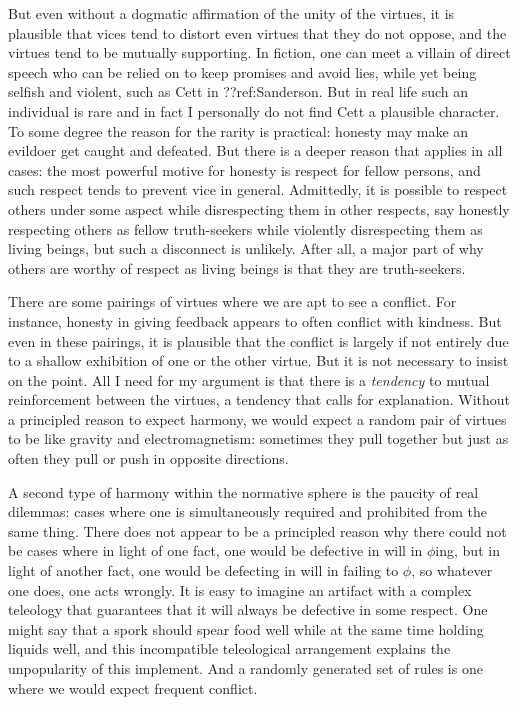 But even without a dogmatic affirmation of the unity of the virtues, it is plausible that vices tend to distort even 
virtues that they do not oppose, and the virtues tend to be mutually supporting. In fiction, one can meet a villain 
of direct speech who can be relied on to keep promises and avoid lies, while yet being selfish and violent, such as Cett in ??ref:Sanderson. 
But in real life such an individual is rare and in fact I personally do not find Cett a plausible character. To some degree 
the reason for the rarity is practical: honesty may make an evildoer
get caught and defeated. But there is a deeper reason that applies in all cases: the most powerful motive for honesty is respect 
for fellow persons, and such respect tends to prevent vice in general. Admittedly, it is possible to respect others 
under some aspect while disrespecting them in other respects, say honestly respecting others as fellow truth-seekers 
while violently disrespecting them as living beings, but such a disconnect is unlikely. After all, a major part of why others 
are worthy of respect as living beings is that they are truth-seekers.

There are some pairings of virtues where we are apt to see a conflict. For instance, honesty in giving feedback appears to 
often conflict with kindness. But even in these pairings, it is plausible that the conflict is largely if not entirely
due to a shallow exhibition of one or the other virtue. But it is not necessary to insist on the point. All I need 
for my argument is that there is a \textit{tendency} to mutual reinforcement between the virtues, a tendency that 
calls for explanation. Without a principled reason to expect harmony, we would expect a random pair of virtues to be 
like gravity and electromagnetism: sometimes they pull together but just as often they pull or push in opposite 
directions.

A second type of harmony within the normative sphere is the paucity of real dilemmas: cases where one is simultaneously
required and prohibited from the same thing. There does not appear to be a principled reason why there could not be 
cases where in light of one fact, one would be defective in will in $\phi$ing, but in light of another fact, one 
would be defecting in will in failing to $\phi$, so whatever one does, one acts wrongly. It is
easy to imagine an artifact with a complex teleology that guarantees that it will 
always be defective in some respect. One might say that a spork should spear food well while at the same time holding 
liquids well, and this incompatible teleological arrangement explains the unpopularity of this implement. And a randomly
generated set of rules is one where we would expect frequent conflict.

